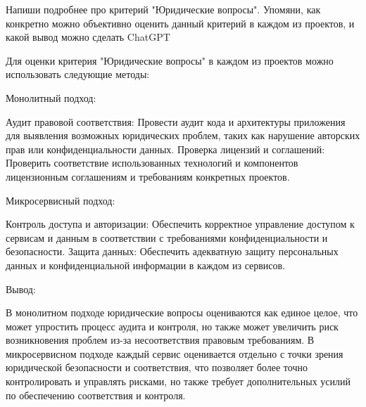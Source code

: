 Напиши подробнее про критерий "Юридические вопросы". Упомяни, как конкретно можно объективно оценить данный критерий в каждом из проектов, и какой вывод можно сделать
ChatGPT

Для оценки критерия "Юридические вопросы" в каждом из проектов можно использовать следующие методы:

Монолитный подход:

    Аудит правовой соответствия: Провести аудит кода и архитектуры приложения для выявления возможных юридических проблем, таких как нарушение авторских прав или конфиденциальности данных.
    Проверка лицензий и соглашений: Проверить соответствие использованных технологий и компонентов лицензионным соглашениям и требованиям конкретных проектов.

Микросервисный подход:

    Контроль доступа и авторизации: Обеспечить корректное управление доступом к сервисам и данным в соответствии с требованиями конфиденциальности и безопасности.
    Защита данных: Обеспечить адекватную защиту персональных данных и конфиденциальной информации в каждом из сервисов.

Вывод:

    В монолитном подходе юридические вопросы оцениваются как единое целое, что может упростить процесс аудита и контроля, но также может увеличить риск возникновения проблем из-за несоответствия правовым требованиям.
    В микросервисном подходе каждый сервис оценивается отдельно с точки зрения юридической безопасности и соответствия, что позволяет более точно контролировать и управлять рисками, но также требует дополнительных усилий по обеспечению соответствия и контроля.



    

\clearpage